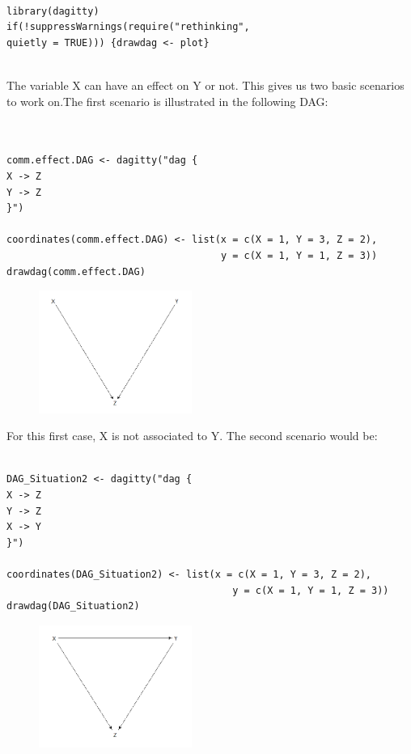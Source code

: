 \documentclass{article}
\begin{document}
\begin{lstlisting}

library(dagitty)
if(!suppressWarnings(require("rethinking", 
quietly = TRUE))) {drawdag <- plot}
  
\end{lstlisting}

The variable X can have an effect on Y or not. This gives us two basic scenarios to work on.The first scenario is illustrated in the following DAG:

\begin{lstlisting}


comm.effect.DAG <- dagitty("dag {
X -> Z
Y -> Z
}")

coordinates(comm.effect.DAG) <- list(x = c(X = 1, Y = 3, Z = 2),
                                     y = c(X = 1, Y = 1, Z = 3))
drawdag(comm.effect.DAG)

\end{lstlisting}

\begin{figure}[h]
\includegraphics[width=5cm]{comm.effect.DAG.png}
\centering
\end{figure}


For this first case, X is not associated to Y. The second scenario would be:

\begin{lstlisting}

DAG_Situation2 <- dagitty("dag {
X -> Z
Y -> Z
X -> Y
}")

coordinates(DAG_Situation2) <- list(x = c(X = 1, Y = 3, Z = 2),
                                       y = c(X = 1, Y = 1, Z = 3))
drawdag(DAG_Situation2)

\end{lstlisting}

\begin{figure}[h]
\includegraphics[width=5cm]{DAG_Situation2.png}
\centering
\end{figure}
\end{document}
